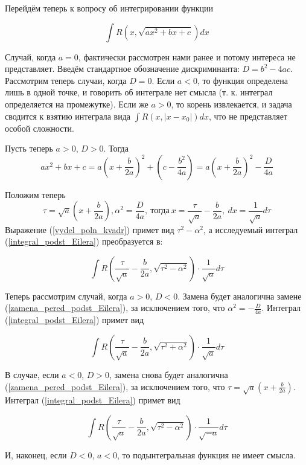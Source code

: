 Перейдём теперь к вопросу об интегрировании функции

\begin{equation}\label{integral_podst_Eilera}
\int R(x,\sqrt{ax^2+bx+c})dx
\end{equation}

Случай, когда $a=0$, фактически рассмотрен нами ранее и потому интереса не представляет.
Введём стандартное обозначение дискриминанта: $D=b^2-4ac$.
Рассмотрим теперь случаи, когда $D=0$.
Если $a<0$, то функция определена лишь в одной точке, и говорить об интеграле нет смысла (т. к. интеграл определяется на промежутке).
Если же $a>0$, то корень извлекается, и задача сводится к взятию интеграла вида $\int R (x,|x-x_0|)dx$, что не представляет особой сложности.

Пусть теперь $a>0$, $D>0$.
Тогда
\begin{equation}\label{vydel_poln_kvadr}
ax^2+bx+c=a\left(x+\frac{b}{2a}\right)^2+\left(c-\frac{b^2}{4a}\right)=a\left(x+\frac{b}{2a}\right)^2-\frac{D}{4a}
\end{equation}

Положим теперь
\begin{equation}\label{zamena_pered_podst_Eilera}
\tau = \sqrt{a}\left(x+\frac{b}{2a}\right),
\alpha^2=\frac{D}{4a}, ~
\text{тогда} ~
x=\frac{\tau}{\sqrt{a}}-\frac{b}{2a}, ~
dx=\frac{1}{\sqrt{a}}d\tau
\end{equation}
Выражение (\ref{vydel_poln_kvadr}) примет вид $\tau^2-\alpha^2$, а исследуемый интеграл (\ref{integral_podst_Eilera}) преобразуется в:

$$
\int R\left(\frac{\tau}{\sqrt{a}}-\frac{b}{2a},\sqrt{\tau^2-\alpha^2}\right)\cdot\frac{1}{\sqrt{a}}d\tau
$$

Теперь рассмотрим случай, когда $a>0$, $D<0$. Замена будет аналогична замене (\ref{zamena_pered_podst_Eilera}), за исключением того, что $\alpha^2=-\frac{D}{4a}$. Интеграл (\ref{integral_podst_Eilera}) примет вид

$$
\int R\left(\frac{\tau}{\sqrt{a}}-\frac{b}{2a},\sqrt{\tau^2+\alpha^2}\right)\cdot\frac{1}{\sqrt{a}}d\tau
$$

В случае, если $a<0$, $D>0$, замена снова будет аналогична (\ref{zamena_pered_podst_Eilera}), за исключением того, что $\tau = \sqrt{a}\left(x+\frac{b}{2a}\right)$. Интеграл (\ref{integral_podst_Eilera}) примет вид

$$
\int R\left(\frac{\tau}{\sqrt{a}}-\frac{b}{2a},\sqrt{\tau^2-\alpha^2}\right)\cdot\frac{1}{\sqrt{-a}}d\tau
$$

И, наконец, если $D<0$, $a<0$, то подынтегральная функция не имеет смысла.

